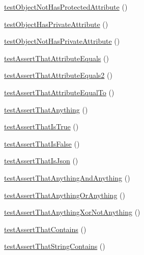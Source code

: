 \begin{DoxyCompactItemize}
\item 
\mbox{\hyperlink{class_framework___assert_test_a7d0c589ae9de666366ad05150daabbc5}{test\+Object\+Not\+Has\+Protected\+Attribute}} ()
\item 
\mbox{\hyperlink{class_framework___assert_test_a655d9680382bb0aeadcdd116a2369f5e}{test\+Object\+Has\+Private\+Attribute}} ()
\item 
\mbox{\hyperlink{class_framework___assert_test_a4c01324833d4ed05eac178e58d0d41b8}{test\+Object\+Not\+Has\+Private\+Attribute}} ()
\item 
\mbox{\hyperlink{class_framework___assert_test_ac9fafc4d5e650daae59c6182bb7c822c}{test\+Assert\+That\+Attribute\+Equals}} ()
\item 
\mbox{\hyperlink{class_framework___assert_test_a90a716a1de2c33e362d68d39d0a522bc}{test\+Assert\+That\+Attribute\+Equals2}} ()
\item 
\mbox{\hyperlink{class_framework___assert_test_a0a36e909c23a75e9ff30ad24dea7e28e}{test\+Assert\+That\+Attribute\+Equal\+To}} ()
\item 
\mbox{\hyperlink{class_framework___assert_test_a88f2cd74056ef6e8be91ed929d973394}{test\+Assert\+That\+Anything}} ()
\item 
\mbox{\hyperlink{class_framework___assert_test_aad7c27adba302ed6000d77e7ed6de042}{test\+Assert\+That\+Is\+True}} ()
\item 
\mbox{\hyperlink{class_framework___assert_test_a7008b26afab95b0f667b5f46c49a27a9}{test\+Assert\+That\+Is\+False}} ()
\item 
\mbox{\hyperlink{class_framework___assert_test_a8c21e54a1a4a4f965e0e6044ff5598c4}{test\+Assert\+That\+Is\+Json}} ()
\item 
\mbox{\hyperlink{class_framework___assert_test_a6aba8dbe3dc05533d95e166fcb135a91}{test\+Assert\+That\+Anything\+And\+Anything}} ()
\item 
\mbox{\hyperlink{class_framework___assert_test_a34926711742f7631e0f566cb1ca3384a}{test\+Assert\+That\+Anything\+Or\+Anything}} ()
\item 
\mbox{\hyperlink{class_framework___assert_test_a6fb2d01ea4cbe190a3cae9b0b76ad500}{test\+Assert\+That\+Anything\+Xor\+Not\+Anything}} ()
\item 
\mbox{\hyperlink{class_framework___assert_test_a830bcc45517be5f6229ab5924bf2949b}{test\+Assert\+That\+Contains}} ()
\item 
\mbox{\hyperlink{class_framework___assert_test_a279cdb45e1143a72fff159be012ead13}{test\+Assert\+That\+String\+Contains}} ()
\item 

\end{DoxyCompactItemize}
